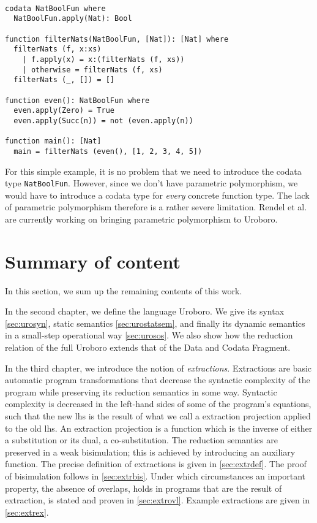 \begin{lstlisting}

codata NatBoolFun where
  NatBoolFun.apply(Nat): Bool

function filterNats(NatBoolFun, [Nat]): [Nat] where
  filterNats (f, x:xs)
    | f.apply(x) = x:(filterNats (f, xs))
    | otherwise = filterNats (f, xs)
  filterNats (_, []) = []

function even(): NatBoolFun where
  even.apply(Zero) = True
  even.apply(Succ(n)) = not (even.apply(n))

function main(): [Nat]
  main = filterNats (even(), [1, 2, 3, 4, 5])

\end{lstlisting}

For this simple example, it is no problem that we need to introduce the codata type \texttt{NatBoolFun}. However, since we don't have parametric polymorphism, we would have to introduce a codata type for \textit{every} concrete function type. The lack of parametric polymorphism therefore is a rather severe limitation. Rendel et al. are currently working on bringing parametric polymorphism to Uroboro.

\section{Summary of content}
\label{sec:soc}

In this section, we sum up the remaining contents of this work.

In the second chapter, we define the language Uroboro. We give its syntax \autoref{sec:urosyn}, static semantics \autoref{sec:urostatsem}, and finally its dynamic semantics in a small-step operational way \autoref{sec:urosos}. We also show how the reduction relation of the full Uroboro extends that of the Data and Codata Fragment.

In the third chapter, we introduce the notion of \textit{extractions}. Extractions are basic automatic program transformations that decrease the syntactic complexity of the program while preserving its reduction semantics in some way. Syntactic complexity is decreased in the left-hand sides of some of the program's equations, such that the new lhs is the result of what we call a extraction projection applied to the old lhs. An extraction projection is a function which is the inverse of either a substitution or its dual, a co-substitution. The reduction semantics are preserved in a weak bisimulation; this is achieved by introducing an auxiliary function. The precise definition of extractions is given in \autoref{sec:extrdef}. The proof of bisimulation follows in \autoref{sec:extrbis}. Under which circumstances an important property, the absence of overlaps, holds in programs that are the result of extraction, is stated and proven in \autoref{sec:extrovl}. Example extractions are given in \autoref{sec:extrex}.

